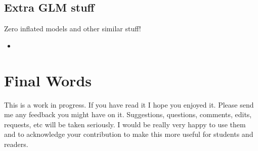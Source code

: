 \documentclass[
]{book}
\providecommand{\tightlist}{%
  \setlength{\itemsep}{0pt}\setlength{\parskip}{0pt}}
\begin{document}
\hypertarget{extra-glm-stuff}{%
\section{Extra GLM stuff}\label{extra-glm-stuff}}

Zero inflated models and other similar stuff!

\begin{itemize}
\tightlist
\item
  \citet{Martin2005}
\end{itemize}

\hypertarget{final-words}{%
\chapter{Final Words}\label{final-words}}

This is a work in progress. If you have read it I hope you enjoyed it. Please send me any feedback you might have on it. Suggestions, questions, comments, edits, requests, etc will be taken seriously. I would be really very happy to use them and to acknowledge your contribution to make this more useful for students and readers.

  
\end{document}
